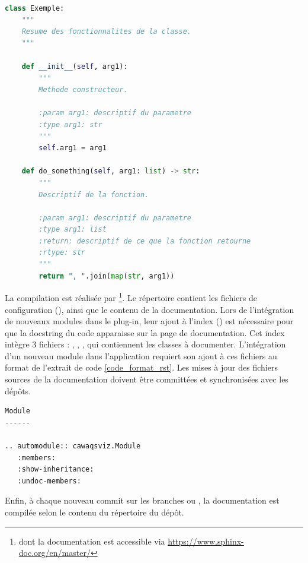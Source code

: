 \begin{lstlisting}[language=Python, caption={Formatage des docstrings pour l'intégration automatique dans la documentation du code}, label={code_format_docstrings}]
class Exemple:
    """
    Resume des fonctionnalites de la classe.
    """

    def __init__(self, arg1):
        """
        Methode constructeur.

        :param arg1: descriptif du parametre
        :type arg1: str
        """
        self.arg1 = arg1

    def do_something(self, arg1: list) -> str:
        """
        Descriptif de la fonction.

        :param arg1: descriptif du parametre
        :type arg1: list
        :return: descriptif de ce que la fonction retourne
        :rtype: str
        """
        return ", ".join(map(str, arg1))
\end{lstlisting}
\vspace{1em}
La compilation est réalisée par \footnote{dont la documentation est accessible via \href{https://www.sphinx-doc.org/en/master/}{https://www.sphinx-doc.org/en/master/}}. Le répertoire  contient les fichiers de configuration (), ainsi que le contenu de la documentation. Lors de l'intégration de nouveaux modules dans le plug-in, leur ajout à l'index () est nécessaire pour que la docstring du code apparaisse sur la page de documentation. Cet index intègre 3 fichiers : , , , qui contiennent les classes à documenter. L'intégration d'un nouveau module dans l'application requiert son ajout à ces fichiers au format de l'extrait de code \ref{code_format_rst}. Les mises à jour des fichiers sources de la documentation doivent être committées et synchronisées avec les dépôts.

\begin{lstlisting}[language=Python,caption={Formatage des docstrings pour l'intégration automatique dans la documentation du code}, label={code_format_rst}]
Module
------

.. automodule:: cawaqsviz.Module
   :members:
   :show-inheritance:
   :undoc-members:
\end{lstlisting}

\vspace{1em}

Enfin, à chaque nouveau commit sur les branches  ou , la documentation est compilée selon le contenu du répertoire  du dépôt.

